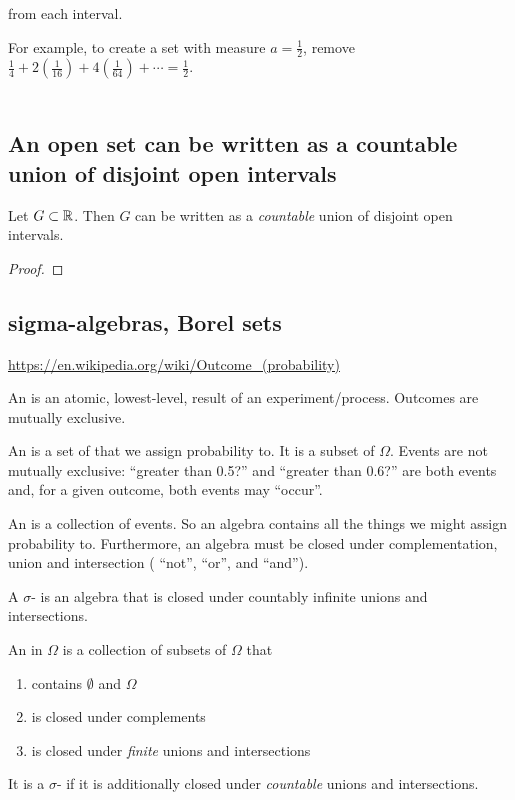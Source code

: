     from each interval.

    For example, to create a set with measure $a = \frac{1}{2}$,
    remove $\frac{1}{4} + 2(\frac{1}{16}) + 4(\frac{1}{64}) + \cdots = \frac{1}{2}$.

    \begin{align*}

    \end{align*}

\subsection{An open set can be written as a countable union of disjoint open intervals}

\begin{theorem}
  Let $G \subset \mathbb{R}$. Then $G$ can be written as a {\it countable} union of disjoint open intervals.
\end{theorem}

\begin{proof}

\end{proof}


\subsection{sigma-algebras, Borel sets}

\url{https://en.wikipedia.org/wiki/Outcome_(probability)}


An  is an atomic, lowest-level, result of an experiment/process. Outcomes are mutually exclusive.

An  is a set of  that we assign probability to. It is a subset of $\Omega$. Events are not mutually
exclusive: ``greater than 0.5?​'' and ``greater than 0.6?​'' are both events and, for a given outcome, both events
may ``occur​''.

An  is a collection of events. So an algebra contains all the things we might assign probability to.
Furthermore, an algebra must be closed under complementation, union and intersection ( ``not​'', ``or​'', and ``and​'').

A $\sigma$- is an algebra that is closed under countably infinite unions and intersections.




\begin{definition*}
  An  in $\Omega$ is a collection of subsets of $\Omega$ that
  \begin{enumerate}
  \item contains $\emptyset$ and $\Omega$
  \item is closed under complements
  \item is closed under {\it finite} unions and intersections
  \end{enumerate}

  It is a $\sigma$- if it is additionally closed under {\it countable} unions and intersections.
\end{definition*}

